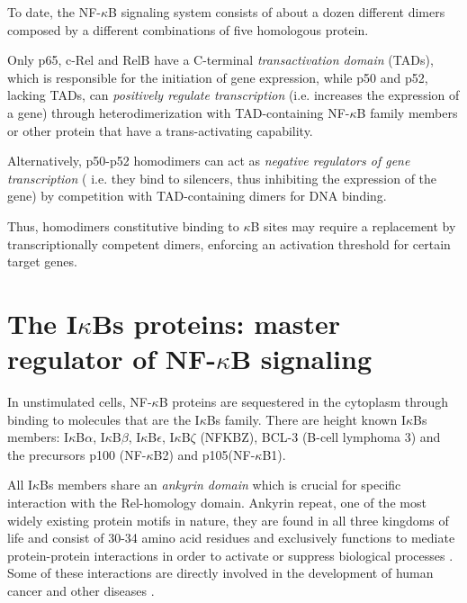 \documentclass[12pt,a4paper]{report}
\begin{document}
To date, the NF-$\kappa$B signaling system consists of about a dozen different dimers composed by a different combinations of five homologous protein.

Only p65, c-Rel and RelB have a C-terminal \emph{transactivation domain} (TADs), which is responsible for the initiation of gene expression, while p50 and p52, lacking TADs, can \emph{positively regulate transcription} (i.e. increases the expression of a gene) through heterodimerization with TAD-containing NF-$\kappa$B family members or other protein that have a trans-activating capability.

Alternatively, p50-p52 homodimers can act as \emph{negative regulators of gene transcription} ( i.e. they bind to silencers, thus inhibiting the expression of the gene) by competition with TAD-containing dimers for DNA binding.

Thus, homodimers constitutive binding to $\kappa$B sites may require a replacement by transcriptionally competent dimers, enforcing an activation threshold for certain target genes.

\section{The I\texorpdfstring{$\kappa$}{}Bs proteins: master regulator of NF-\texorpdfstring{$\kappa$}{}B signaling}\label{IkBs}
In unstimulated cells, NF-$\kappa$B proteins are sequestered in the cytoplasm through binding to molecules that are the I$\kappa$Bs family. There are height known I$\kappa$Bs members: I$\kappa$B$\alpha$, I$\kappa$B$\beta$, I$\kappa$B$\epsilon$, I$\kappa$B$\zeta$ (NFKBZ), BCL-3 (B-cell lymphoma 3) and the precursors p100 (NF-$\kappa$B2) and p105(NF-$\kappa$B1). 

All I$\kappa$Bs members share an \emph{ankyrin domain} which is crucial for specific interaction with the Rel-homology domain. Ankyrin repeat, one of the most widely existing protein motifs in nature, they are found in all three kingdoms of life and consist of 30-34 amino acid residues and exclusively functions to mediate protein-protein interactions in order to activate or suppress biological processes \cite{Ankyrin}. Some of these interactions are directly involved in the development of human cancer and other diseases \cite{AnkyrinMotif}.
\end{document}
